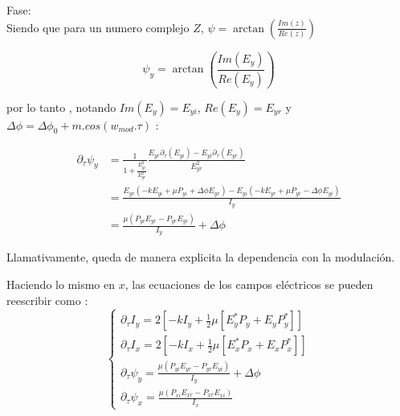 	Fase:\\
	
	Siendo que para un numero complejo $Z$, $\psi=\arctan(\frac{Im(z)}{Re(z)})$
	
	\[  \psi_y= \arctan(\frac{Im(E_y)}{Re(E_y)}) \]
	
	por  lo tanto , notando $Im(E_y)=E_{yi}$, $Re(E_y)=E_{yr}$ y $\Delta \phi=\Delta \phi_0 + m.cos(w_{mod}.\tau) $ :
	
	\begin{align}
	\partial_{\tau}\psi_y  &= \frac{1}{ 1+\frac{ E^2_{yi} }{ E^2_{yr} } }\frac{ E_{yr} \partial_{\tau}( E_{yi} ) - E_{yi} \partial_{\tau}( E_{yr} ) }{ E^2_{yr} } \\ 
	&= \frac{ E_{yr} ( -kE_{yi}+\mu P_{yi}+\Delta \phi E_{yr} ) -  E_{yi} ( -kE_{yr}+\mu P_{yr}-\Delta \phi E_{yi} ) }{ I_y } \\
	&= \frac{ \mu ( P_{yi} E_{yr} - P_{yr} E_{yi} ) }{ I_y } + \Delta \phi	
	\end{align}
	
	Llamativamente, queda de manera explicita la dependencia con la modulación.
	
	Haciendo lo mismo en $x$, las ecuaciones de los campos eléctricos se pueden reescribir como :
	\begin{equation}
	\begin{cases}
	\partial_{\tau}I_y=2[-k I_y +\tfrac{1}{2}\mu[E^*_yP_y+E_yP^*_y]   ] \\
	\partial_{\tau}I_x=2[-k I_x +\tfrac{1}{2}\mu[E^*_xP_x+E_xP^*_x]   ]	\\	
	\partial_{\tau}\psi_y  = \frac{ \mu ( P_{yi} E_{yr} - P_{yr} E_{yi} ) }{ I_y } + \Delta \phi \\
	\partial_{\tau}\psi_x  = \frac{\mu(P_{xi}E_{xr}-P_{xr}E_{xi})}{I_x}
	\end{cases}
	\label{eq: int y fases}
	\end{equation}
	
	
	
